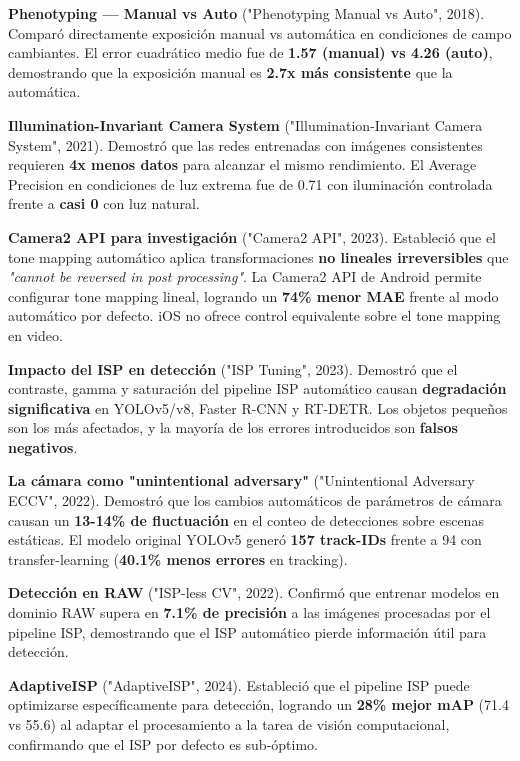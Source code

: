 \textbf{Phenotyping — Manual vs Auto} ("Phenotyping Manual vs Auto", 2018). Comparó directamente exposición manual vs automática en condiciones de campo cambiantes. El error cuadrático medio fue de \textbf{1.57 (manual) vs 4.26 (auto)}, demostrando que la exposición manual es \textbf{2.7x más consistente} que la automática.


\textbf{Illumination-Invariant Camera System} ("Illumination-Invariant Camera System", 2021). Demostró que las redes entrenadas con imágenes consistentes requieren \textbf{4x menos datos} para alcanzar el mismo rendimiento. El Average Precision en condiciones de luz extrema fue de 0.71 con iluminación controlada frente a \textbf{casi 0} con luz natural.


\textbf{Camera2 API para investigación} ("Camera2 API", 2023). Estableció que el tone mapping automático aplica transformaciones \textbf{no lineales irreversibles} que \textit{"cannot be reversed in post processing"}. La Camera2 API de Android permite configurar tone mapping lineal, logrando un \textbf{74\% menor MAE} frente al modo automático por defecto. iOS no ofrece control equivalente sobre el tone mapping en video.


\textbf{Impacto del ISP en detección} ("ISP Tuning", 2023). Demostró que el contraste, gamma y saturación del pipeline ISP automático causan \textbf{degradación significativa} en YOLOv5/v8, Faster R-CNN y RT-DETR. Los objetos pequeños son los más afectados, y la mayoría de los errores introducidos son \textbf{falsos negativos}.


\textbf{La cámara como "unintentional adversary"} ("Unintentional Adversary ECCV", 2022). Demostró que los cambios automáticos de parámetros de cámara causan un \textbf{13-14\% de fluctuación} en el conteo de detecciones sobre escenas estáticas. El modelo original YOLOv5 generó \textbf{157 track-IDs} frente a 94 con transfer-learning (\textbf{40.1\% menos errores} en tracking).


\textbf{Detección en RAW} ("ISP-less CV", 2022). Confirmó que entrenar modelos en dominio RAW supera en \textbf{7.1\% de precisión} a las imágenes procesadas por el pipeline ISP, demostrando que el ISP automático pierde información útil para detección.


\textbf{AdaptiveISP} ("AdaptiveISP", 2024). Estableció que el pipeline ISP puede optimizarse específicamente para detección, logrando un \textbf{28\% mejor mAP} (71.4 vs 55.6) al adaptar el procesamiento a la tarea de visión computacional, confirmando que el ISP por defecto es sub-óptimo.


